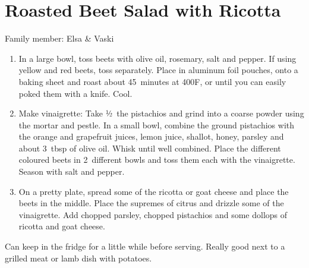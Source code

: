 \chapter{Roasted Beet Salad with Ricotta}
\label{ch:roasted-beet-salad}


Family member: Elsa \& Vaski

\begin{enumerate}
    \item In a large bowl, toss beets with olive oil, rosemary, salt and pepper. If using yellow and red beets, toss separately. Place in aluminum foil pouches, onto a baking sheet and roast about 45~minutes at 400\degree F, or until you can easily poked them with a knife. Cool.
    \item Make vinaigrette: Take ½~the pistachios and grind into a coarse powder using the mortar and pestle. In a small bowl, combine the ground pistachios with the orange and grapefruit juices, lemon juice, shallot, honey, parsley and about 3~tbsp of olive oil. Whisk until well combined. Place the different coloured beets in 2~different bowls and toss them each with the vinaigrette. Season with salt and pepper.
    \item On a pretty plate, spread some of the ricotta or goat cheese and place the beets in the middle. Place the supremes of citrus and drizzle some of the vinaigrette. Add chopped parsley, chopped pistachios and some dollops of ricotta and goat cheese.
\end{enumerate}

Can keep in the fridge for a little while before serving.
Really good next to a grilled meat or lamb dish with potatoes.

